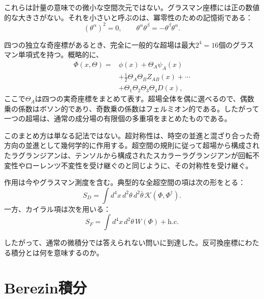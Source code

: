 これらは計量の意味での微小な空間次元ではない。グラスマン座標には正の数値的な大きさがない。それを小さいと呼ぶのは、冪零性のための記憶術である：
\begin{equation}
(\theta^\alpha)^2=0,
\qquad
\theta^\alpha\theta^\beta=-\theta^\beta\theta^\alpha.
\end{equation}

四つの独立な奇座標があるとき、完全に一般的な超場は最大\(2^4=16\)個のグラスマン単項式を持つ。概略的に、
\begin{equation}
\begin{aligned}
\Phi(x,\Theta)={}&\phi(x)+\Theta_A\psi_A(x)\\
&+\frac{1}{2}\Theta_A\Theta_B Z_{AB}(x)+\cdots\\
&+\Theta_1\Theta_2\Theta_3\Theta_4D(x),
\end{aligned}
\end{equation}
ここで\(\Theta_A\)は四つの実奇座標をまとめて表す。超場全体を偶に選べるので、偶数乗の係数はボソン的であり、奇数乗の係数はフェルミオン的である。したがって一つの超場は、通常の成分場の有限個の多重項をまとめたものである。

このまとめ方は単なる記法ではない。超対称性は、時空の並進と混ざり合った奇方向の並進として幾何学的に作用する。超空間の規則に従って超場から構成されたラグランジアンは、テンソルから構成されたスカラーラグランジアンが回転不変性やローレンツ不変性を受け継ぐのと同じように、その対称性を受け継ぐ。

作用は今やグラスマン測度を含む。典型的な全超空間の項は次の形をとる：
\begin{equation}
S_D=\int d^4x\,d^2\theta\,d^2\bar\theta\,
\mathcal K(\Phi,\Phi^\dagger).
\end{equation}
一方、カイラル項は次を用いる：
\begin{equation}
S_F=\int d^4x\,d^2\theta\,W(\Phi)+\mathrm{h.c.}
\end{equation}

したがって、通常の微積分では答えられない問いに到達した。反可換座標にわたる積分とは何を意味するのか。

\section{Berezin積分}

